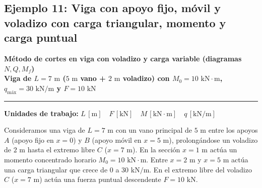 \subsection{Ejemplo 11: Viga con apoyo fijo, móvil y voladizo con carga triangular, momento y carga puntual}

\begin{tcolorbox}[colback=blue!3!white, colframe=blue!40!black, arc=3pt, boxrule=0.8pt, left=8pt, right=8pt, top=6pt, bottom=6pt]
    \centering
    {\Large\bfseries\color{blue!60!black} Método de cortes en viga con voladizo y carga variable (diagramas $N, Q, M_f$)}\\[2pt]
    {\normalsize\bfseries Viga de $L = 7\text{ m}$ ($5\text{ m}$ vano + $2\text{ m}$ voladizo) con $M_0 = 10\text{ kN}\cdot\text{m}$, $q_{\text{máx}} = 30\text{ kN/m}$ y $F = 10\text{ kN}$}

    \vspace{4pt}\hrule\vspace{4pt}
    {\small\textbf{Unidades de trabajo:} $L\,[\text{m}] \quad F\,[\text{kN}] \quad M\,[\text{kN}\cdot\text{m}] \quad q\,[\text{kN/m}]$}
\end{tcolorbox}


Consideramos una viga de $L = 7\text{ m}$ con un vano principal de $5\text{ m}$ entre los apoyos $A$ (apoyo fijo en $x=0$) y $B$ (apoyo móvil en $x=5\text{ m}$), prolongándose un voladizo de $2\text{ m}$ hasta el extremo libre $C$ ($x=7\text{ m}$). En la sección $x = 1\text{ m}$ actúa un momento concentrado horario $M_0 = 10\text{ kN}\cdot\text{m}$. Entre $x = 2\text{ m}$ y $x = 5\text{ m}$ actúa una carga triangular que crece de $0$ a $30\text{ kN/m}$. En el extremo libre del voladizo $C$ ($x=7\text{ m}$) actúa una fuerza puntual descendente $F = 10\text{ kN}$.


